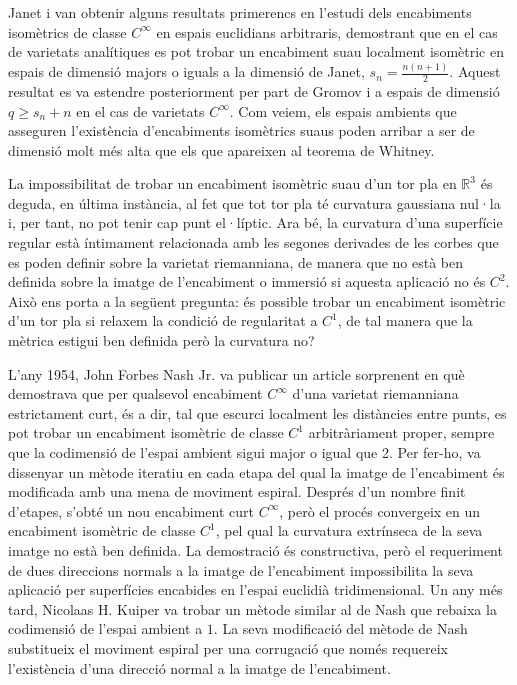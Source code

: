 Janet i \citet{cartan1927} van obtenir alguns resultats primerencs en l'estudi dels encabiments isomètrics de classe $C^\infty$ en espais euclidians arbitraris, demostrant que en el cas de varietats analítiques es pot trobar un encabiment suau localment isomètric en espais de dimensió majors o iguals a la dimensió de Janet, $s_n = \frac{n(n+1)}{2}$. Aquest resultat es va estendre posteriorment per part de Gromov i \citet{rokhlin1970} a espais de dimensió $q\ge s_n+n$ en el cas de varietats $C^\infty$. Com veiem, els espais ambients que asseguren l'existència d'encabiments isomètrics suaus poden arribar a ser de dimensió molt més alta que els que apareixen al teorema de Whitney.

La impossibilitat de trobar un encabiment isomètric suau d'un tor pla en $\mathbb R^3$ és deguda, en última instància, al fet que tot tor pla té curvatura gaussiana nul·la i, per tant, no pot tenir cap punt el·líptic. Ara bé, la curvatura d'una superfície regular està íntimament relacionada amb les segones derivades de les corbes que es poden definir sobre la varietat riemanniana, de manera que no està ben definida sobre la imatge de l'encabiment o immersió si aquesta aplicació no és $C^2$. Això ens porta a la següent pregunta: és possible trobar un encabiment isomètric d'un tor pla si relaxem la condició de regularitat a $C^1$, de tal manera que la mètrica estigui ben definida però la curvatura no?

L'any 1954, John Forbes Nash Jr. va publicar un article sorprenent en què demostrava que per qualsevol encabiment $C^\infty$ d'una varietat riemanniana estrictament curt, és a dir, tal que escurci localment les distàncies entre punts, es pot trobar un encabiment isomètric de classe $C^1$ arbitràriament proper, sempre que la codimensió de l'espai ambient sigui major o igual que 2. Per fer-ho, va dissenyar un mètode iteratiu en cada etapa del qual la imatge de l'encabiment és modificada amb una mena de moviment espiral. Després d'un nombre finit d'etapes, s'obté un nou encabiment curt $C^\infty$, però el procés convergeix en un encabiment isomètric de classe $C^1$, pel qual la curvatura extrínseca de la seva imatge no està ben definida. La demostració és constructiva, però el requeriment de dues direccions normals a la imatge de l'encabiment impossibilita la seva aplicació per superfícies encabides en l'espai euclidià tridimensional. Un any més tard, Nicolaas H. Kuiper va trobar un mètode similar al de Nash que rebaixa la codimensió de l'espai ambient a $1$. La seva modificació del mètode de Nash substitueix el moviment espiral per una corrugació que només requereix l'existència d'una direcció normal a la imatge de l'encabiment.

